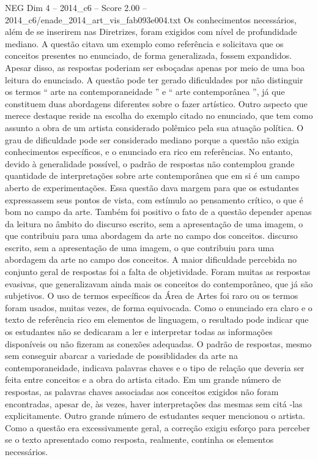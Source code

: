 \begin{textsample}{NEG Dim 4 – 2014\_c6 – Score 2.00 – 2014\_c6/enade\_2014\_art\_vis\_fab093e004.txt}
Os conhecimentos necessários, além de se inserirem nas Diretrizes, foram exigidos com nível de profundidade mediano.
A questão citava um exemplo como referência e solicitava que os conceitos presentes no enunciado, de forma generalizada, fossem expandidos.
Apesar disso, as respostas poderiam ser esboçadas apenas por meio de uma boa leitura do enunciado.
A questão pode ter gerado dificuldades por não distinguir os termos “ arte na contemporaneidade ” e “ arte contemporânea ”, já que constituem duas abordagens diferentes sobre o fazer artístico.
Outro aspecto que merece destaque reside na escolha do exemplo citado no enunciado, que tem como assunto a obra de um artista considerado polêmico pela sua atuação política.
O grau de dificuldade pode ser considerado mediano porque a questão não exigia conhecimentos específicos, e o enunciado era rico em referências.
No entanto, devido à generalidade possível, o padrão de respostas não contemplou grande quantidade de interpretações sobre arte contemporânea que em si é um campo aberto de experimentações.
Essa questão dava margem para que os estudantes expressassem seus pontos de vista, com estímulo ao pensamento crítico, o que é bom no campo da arte.
Também foi positivo o fato de a questão depender apenas da leitura no âmbito do discurso escrito, sem a apresentação de uma imagem, o que contribuiu para uma abordagem da arte no campo dos conceitos. discurso escrito, sem a apresentação de uma imagem, o que contribuiu para uma abordagem da arte no campo dos conceitos.
A maior dificuldade percebida no conjunto geral de respostas foi a falta de objetividade.
Foram muitas as respostas evasivas, que generalizavam ainda mais os conceitos do contemporâneo, que já são subjetivos.
O uso de termos específicos da Área de Artes foi raro ou os termos foram usados, muitas vezes, de forma equivocada.
Como o enunciado era claro e o texto de referência rico em elementos de linguagem, o resultado pode indicar que os estudantes não se dedicaram a ler e interpretar todas as informações disponíveis ou não fizeram as conexões adequadas.
O padrão de respostas, mesmo sem conseguir abarcar a variedade de possiblidades da arte na contemporaneidade, indicava palavras chaves e o tipo de relação que deveria ser feita entre conceitos e a obra do artista citado.
Em um grande número de respostas, as palavras chaves associadas aos conceitos exigidos não foram encontradas, apesar de, às vezes, haver interpretações das mesmas sem citá -las explicitamente.
Outro grande número de estudantes sequer mencionou o artista.
Como a questão era excessivamente geral, a correção exigiu esforço para perceber se o texto apresentado como resposta, realmente, continha os elementos necessários.

\end{textsample}
